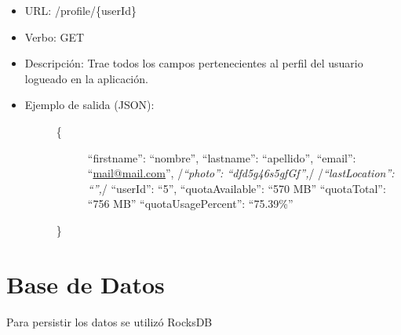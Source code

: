 \documentclass[letterpaper,10pt,english]{sphinxmanual}
\begin{document}
\begin{itemize}
\item {} 
URL: /profile/\{userId\}

\item {} 
Verbo: GET

\item {} 
Descripción: Trae todos los campos pertenecientes al perfil del usuario logueado en la aplicación.

\item {} \begin{description}
\item[{Ejemplo de salida (JSON):}] \leavevmode\begin{description}
\item[{\{}] \leavevmode
``firstname'': ``nombre'',
``lastname'': ``apellido'',
``email'': ``\href{mailto:mail@mail.com}{mail@mail.com}'',
/\emph{``photo'': ``dfd5g46s5gfGf'',}/
/\emph{``lastLocation'': ``'',}/
``userId'': ``5'',
``quotaAvailable'': ``570 MB''
``quotaTotal'': ``756 MB''
``quotaUsagePercent'': ``75.39\%''

\end{description}

\}

\end{description}

\end{itemize}


\section{Base de Datos}
\label{uDriveDoc:base-de-datos}
Para persistir los datos se utilizó RocksDB
\end{document}
